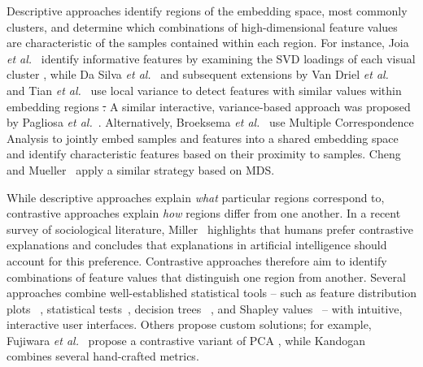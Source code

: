 \documentclass[lettersize,journal]{IEEEtran}
\makeatletter
\newcommand{\etal}{\textit{et al.\xspace}}
\providecommand{\DIFadd}[1]{{\protect\color{blue}\uwave{#1}}} %
\providecommand{\DIFdel}[1]{{\protect\color{red}\sout{#1}}} %
\providecommand{\DIFaddbegin}{} %
\providecommand{\DIFaddend}{} %
\providecommand{\DIFdelbegin}{} %
\providecommand{\DIFdelend}{} %
\providecommand{\DIFscaledelfig}{0.5}
\newlength{\DIFdelgraphicswidth} %
\newlength{\DIFdelgraphicsheight} %
\providecommand{\DIFaddincludegraphics}[2][]{{\color{blue}\fbox{\DIFOincludegraphics[#1]{#2}}}} %
\providecommand{\DIFdelincludegraphics}[2][]{%
\sbox{\DIFdelgraphicsbox}{\DIFOincludegraphics[#1]{#2}}%
\settoboxwidth{\DIFdelgraphicswidth}{\DIFdelgraphicsbox} %
\settoboxtotalheight{\DIFdelgraphicsheight}{\DIFdelgraphicsbox} %
\scalebox{\DIFscaledelfig}{%
\parbox[b]{\DIFdelgraphicswidth}{\usebox{\DIFdelgraphicsbox}\\[-\baselineskip] \rule{\DIFdelgraphicswidth}{0em}}\llap{\resizebox{\DIFdelgraphicswidth}{\DIFdelgraphicsheight}{%
\setlength{\unitlength}{\DIFdelgraphicswidth}%
\begin{picture}(1,1)%
\thicklines\linethickness{2pt} %
{\color[rgb]{1,0,0}\put(0,0){\framebox(1,1){}}}%
{\color[rgb]{1,0,0}\put(0,0){\line( 1,1){1}}}%
{\color[rgb]{1,0,0}\put(0,1){\line(1,-1){1}}}%
\end{picture}%
}\hspace*{3pt}}} %
} %
\DeclareRobustCommand{\DIFaddbegin}{\DIFOaddbegin \let\includegraphics\DIFaddincludegraphics} %
\DeclareRobustCommand{\DIFaddend}{\DIFOaddend \let\includegraphics\DIFOincludegraphics} %
\DeclareRobustCommand{\DIFdelbegin}{\DIFOdelbegin \let\includegraphics\DIFdelincludegraphics} %
\DeclareRobustCommand{\DIFdelend}{\DIFOaddend \let\includegraphics\DIFOincludegraphics} %
\let\sout@orig\sout %
\renewcommand{\sout}[1]{\ifmmode\text{\sout@orig{\ensuremath{#1}}}\else\sout@orig{#1}\fi} %
\makeatother
\begin{document}
Descriptive approaches identify regions of the embedding space, most commonly clusters, and determine which combinations of high-dimensional feature values are characteristic of the samples contained within each region.
For instance, Joia \etal~\cite{Joia2015} identify informative features by examining the SVD loadings of each visual cluster \DIFaddbegin \DIFadd{(Fig.~\ref{fig:related_methods}.g)}\DIFaddend , while Da Silva \etal~\cite{DaSilva2015} and subsequent extensions by Van Driel \etal~\cite{VanDriel2020} and Tian \etal~\cite{Tian2021} use local variance to detect features with similar values within embedding regions \DIFdelbegin \DIFdel{.
}\DIFdelend \DIFaddbegin \DIFadd{(Fig.~\ref{fig:related_methods}.f).
}\DIFaddend A similar interactive, variance-based approach was proposed by Pagliosa \etal~\cite{Pagliosa2016}.
Alternatively, Broeksema \etal~\cite{Broeksema2013} use Multiple Correspondence Analysis to jointly embed samples and features into a shared embedding space and identify characteristic features based on their proximity to samples. Cheng and Mueller~\cite{ChengMueller2016} apply a similar strategy based on MDS.

While descriptive approaches explain \textit{what} particular regions correspond to, contrastive approaches explain \textit{how} regions differ from one another. In a recent survey of sociological literature, Miller~\cite{Miller2019} highlights that humans prefer contrastive explanations and concludes that explanations in artificial intelligence should account for this preference.
Contrastive approaches therefore aim to identify combinations of feature values that distinguish one region from another.
Several approaches combine well-established statistical tools -- such as feature distribution plots~\cite{Stahnke2016,Eckelt2022} \DIFaddbegin \DIFadd{(Fig.~\ref{fig:related_methods}.b)}\DIFaddend , statistical tests~\cite{Marcilio2021}, decision trees~\cite{Bibal2021} \DIFaddbegin \DIFadd{(Fig.~\ref{fig:related_methods}.c)}\DIFaddend , and Shapley values~\cite{MarcilioEler2021} -- with intuitive, interactive user interfaces.
Others propose custom solutions; for example, Fujiwara \etal~\cite{Fujiwara2020} propose a contrastive variant of PCA \DIFaddbegin \DIFadd{(Fig.~\ref{fig:related_methods}.d)}\DIFaddend , while Kandogan~\cite{Kandogan2012} combines several hand-crafted metrics.
\end{document}
